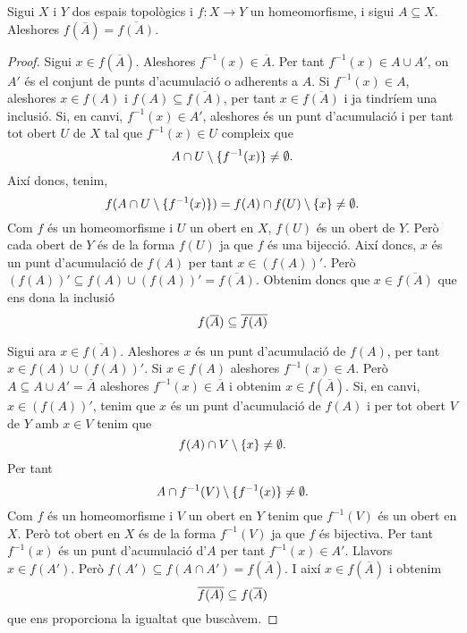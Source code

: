 \documentclass[../main.tex]{subfiles}
\begin{document}
\begin{ter}
\label{ter:clausurahomeomorfisme} Sigui $X$ i $Y$ dos espais topològics i $f:X\rightarrow Y$ un homeomorfisme, i sigui $A\subseteq X$. Aleshores $f(\overline{A}) = \overline{f(A)}$.
\end{ter}
\begin{proof}
Sigui $x\in f(\overline{A})$. Aleshores $f^{-1}(x)\in \overline{A}$. Per tant $f^{-1}(x)\in A\cup A'$, on $A'$ és el conjunt de punts d'acumulació o adherents a $A$. Si $f^{-1}(x)\in A$, aleshores $x\in f(A)$ i $f(A)\subseteq\overline{f(A)}$, per tant $x\in \overline{f(A)}$ i ja tindríem  una inclusió. Si, en canvi, $f^{-1}(x)\in A'$, aleshores és un punt d'acumulació i per tant tot obert $U$ de $X$ tal que $f^{-1}(x)\in U$ compleix que 
\begin{equation}
    \notag
    A\cap U\setminus\{f^{-1}(x)\}\not=\emptyset .
\end{equation}
Així doncs, tenim,
\begin{equation}
    \notag
    f(A\cap U\setminus\{f^{-1}(x)\}) = f(A)\cap f(U)\setminus\{x\}\not=\emptyset.
\end{equation}
Com $f$ és un homeomorfisme i $U$ un obert en $X$, $f(U)$ és un obert de $Y$. Però cada obert de $Y$ és de la forma $f(U)$ ja que $f$ és una bijecció. Així doncs, $x$ és un punt d'acumulació de $f(A)$ per tant $x\in (f(A))'$. Però $(f(A))'\subseteq f(A)\cup (f(A))' = \overline{f(A)}$. Obtenim doncs que $x\in\overline{f(A)}$ que ens dona la inclusió
\begin{equation}
    \notag
    f(\overline{A})\subseteq \overline{f(A)}
\end{equation}

Sigui ara $x\in \overline{f(A)}$. Aleshores $x$ és un punt d'acumulació de $f(A)$, per tant $x\in f(A)\cup (f(A))'$. Si $x\in f(A)$ aleshores $f^{-1}(x)\in A$. Però $A\subseteq A\cup A' = \overline{A}$ aleshores $f^{-1}(x)\in\overline{A}$ i obtenim $x\in f(\overline{A})$. Si, en canvi, $x\in (f(A))'$, tenim que $x$ és un punt d'acumulació de $f(A)$ i per tot obert $V$ de $Y$ amb $x\in V$ tenim que
\begin{equation}
    \notag
    f(A)\cap V\setminus\{x\}\not=\emptyset.
\end{equation}
Per tant
\begin{equation}
    \notag
    A\cap f^{-1}(V)\setminus\{f^{-1}(x)\}\not=\emptyset.
\end{equation}
Com $f$ és un homeomorfisme i $V$ un obert en $Y$ tenim que $f^{-1}(V)$ és un obert en $X$. Però tot obert en $X$ és de la forma $f^{-1}(V)$ ja que $f$ és bijectiva. Per tant $f^{-1}(x)$ és un punt d'acumulació d'$A$ per tant $f^{-1}(x)\in A'$. Llavors $x\in f(A')$. Però $f(A')\subseteq f(A\cap A') = f(\overline{A})$. I així $x\in f(\overline{A})$ i obtenim
\begin{equation}
    \notag
    \overline{f(A)}\subseteq f(\overline{A})
\end{equation}
que ens proporciona la igualtat que buscàvem.
\end{proof}
\end{document}
